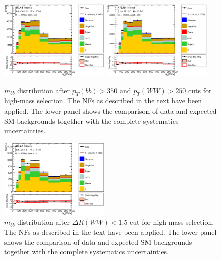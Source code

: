 \clearpage
\begin{figure}
\begin{center}
\includegraphics*[width=0.47\textwidth] {figures/Unblinded_mbb/C_reOpt2000_bbpt350_bbMass_regionA_met25d020.eps}
\includegraphics*[width=0.47\textwidth] {figures/Unblinded_mbb/C_reOpt2000_bbpt350_wwpt250_bbMass_regionA_met25d020.eps}
\caption[$m_{bb}$ distribution after $p_{T}(bb) > 350$ and  $p_{T}(WW) > 250$ cuts for high-mass selection.]{$m_{bb}$ distribution after $p_{T}(bb) > 350$ and  $p_{T}(WW) > 250$ cuts for high-mass selection. The NFs as described in the text have been applied. The lower panel shows the comparison of data and expected SM backgrounds together with the complete systematics uncertainties.}
\end{center}
\end{figure}

\begin{figure}
\begin{center}
\includegraphics*[width=0.47\textwidth] {figures/Unblinded_mbb/C_reOpt2000_bbpt350_wwpt250_drww15_bbMass_regionA_met25d020.eps}
\caption[$m_{bb}$ distribution after  $\Delta R(WW) < 1.5$ cut for high-mass selection.]{$m_{bb}$ distribution after $\Delta R(WW) < 1.5$ cut for high-mass selection. The NFs as described in the text have been applied. The lower panel shows the comparison of data and expected SM backgrounds together with the complete systematics uncertainties.}
\end{center}
\end{figure}

